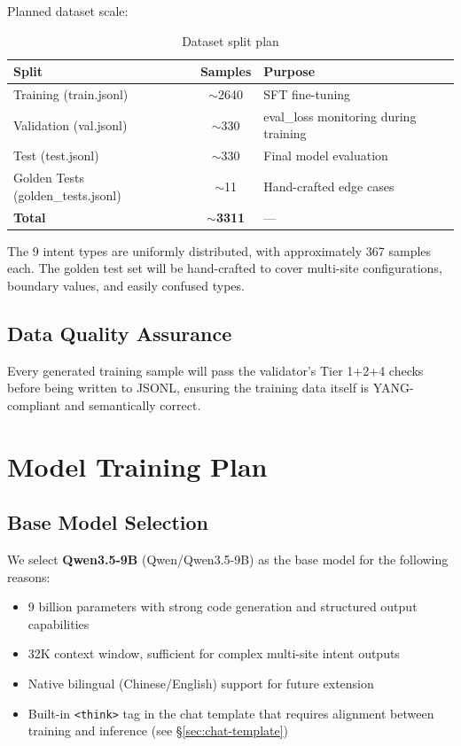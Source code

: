 \documentclass[12pt, a4paper]{article}
\newcommand{\yang}{\textsc{YANG}}
\begin{document}
\noindent
Planned dataset scale:

\begin{table}[H]
\centering
\caption{Dataset split plan}
\label{tab:data-split}
\small
\begin{tabular}{lcl}
\toprule
\textbf{Split} & \textbf{Samples} & \textbf{Purpose} \\
\midrule
Training (train.jsonl) & $\sim$2640 & SFT fine-tuning \\
Validation (val.jsonl)   & $\sim$330  & eval\_loss monitoring during training \\
Test (test.jsonl)  & $\sim$330  & Final model evaluation \\
Golden Tests (golden\_tests.jsonl) & $\sim$11 & Hand-crafted edge cases \\
\midrule
\textbf{Total} & $\sim$\textbf{3311} & --- \\
\bottomrule
\end{tabular}
\end{table}

\noindent
The 9 intent types are uniformly distributed, with approximately 367 samples each. The golden test set will be hand-crafted to cover multi-site configurations, boundary values, and easily confused types.

\subsection{Data Quality Assurance}

Every generated training sample will pass the validator's Tier 1+2+4 checks before being written to JSONL, ensuring the training data itself is \yang{}-compliant and semantically correct.

\section{Model Training Plan}
\label{sec:training}

\subsection{Base Model Selection}

We select \textbf{Qwen3.5-9B} (Qwen/Qwen3.5-9B) as the base model for the following reasons:

\begin{itemize}
  \item 9 billion parameters with strong code generation and structured output capabilities
  \item 32K context window, sufficient for complex multi-site intent outputs
  \item Native bilingual (Chinese/English) support for future extension
  \item Built-in \texttt{<think>} tag in the chat template that requires alignment between training and inference (see \S\ref{sec:chat-template})
\end{itemize}
\end{document}
